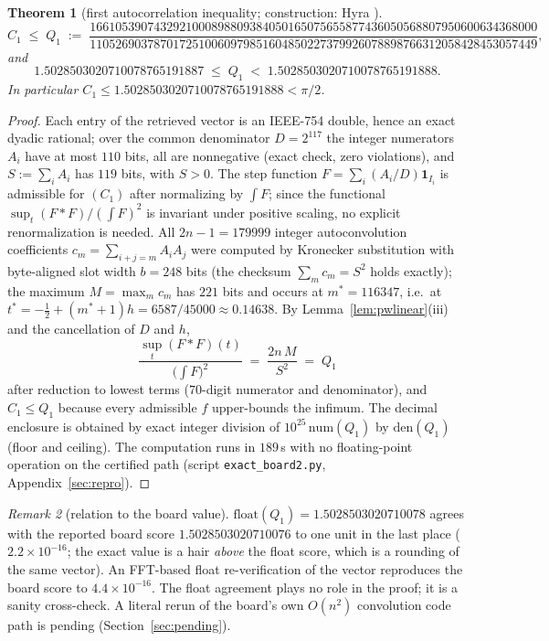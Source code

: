 \documentclass[11pt]{article}
\newtheorem{theorem}{Theorem}
\theoremstyle{remark}
\newtheorem{remark}[theorem]{Remark}
\begin{document}
\begin{theorem}[first autocorrelation inequality; construction: Hyra
\cite{Hyra26}]\label{thm:c1}
\[
C_1 \;\le\; Q_1 \;:=\;
\frac{1661053907432921000898809384050165075655877436050568807950600634368000}
     {1105269037870172510060979851604850227379926078898766312058428453057449},
\]
and
\[
1.5028503020710078765191887 \;\le\; Q_1 \;<\; 1.5028503020710078765191888 .
\]
In particular $C_1 \le 1.5028503020710078765191888 < \pi/2$.
\end{theorem}

\begin{proof}
Each entry of the retrieved vector is an IEEE-754 double, hence an exact
dyadic rational; over the common denominator $D = 2^{117}$ the integer
numerators $A_i$ have at most $110$ bits, all are nonnegative (exact check,
zero violations), and $S := \sum_i A_i$ has $119$ bits, with $S > 0$. The
step function $F = \sum_i (A_i/D) \mathbf{1}_{I_i}$ is admissible for
$(C_1)$ after normalizing by $\int F$; since the functional
$\sup_t (F*F) / (\int F)^2$ is invariant under positive scaling, no explicit
renormalization is needed. All $2n - 1 = 179999$ integer autoconvolution
coefficients $c_m = \sum_{i+j=m} A_i A_j$ were computed by Kronecker
substitution with byte-aligned slot width $b = 248$ bits (the checksum
$\sum_m c_m = S^2$ holds exactly); the maximum $M = \max_m c_m$ has $221$
bits and occurs at $m^\ast = 116347$, i.e.\ at
$t^\ast = -\tfrac12 + (m^\ast + 1)h = 6587/45000 \approx 0.14638$. By
Lemma~\ref{lem:pwlinear}(iii) and the cancellation of $D$ and $h$,
\[
\frac{\sup_t (F * F)(t)}{\bigl(\int F\bigr)^2}
\;=\; \frac{2n\,M}{S^2} \;=\; Q_1
\]
after reduction to lowest terms ($70$-digit numerator and denominator), and
$C_1 \le Q_1$ because every admissible $f$ upper-bounds the infimum. The
decimal enclosure is obtained by exact integer division of
$10^{25}\,\mathrm{num}(Q_1)$ by $\mathrm{den}(Q_1)$ (floor and ceiling). The
computation runs in $189$\,s with no floating-point operation on the
certified path (script \texttt{exact\_board2.py},
Appendix~\ref{sec:repro}).
\end{proof}

\begin{remark}[relation to the board value]\label{rem:c1board}
$\mathrm{float}(Q_1) = 1.5028503020710078$ agrees with the reported board
score $1.5028503020710076$ to one unit in the last place
($2.2\times10^{-16}$; the exact value is a hair \emph{above} the float
score, which is a rounding of the same vector). An FFT-based float
re-verification of the vector reproduces the board score to
$4.4\times10^{-16}$. The float agreement plays no role in the proof; it is
a sanity cross-check. A literal rerun of the board's own $O(n^2)$
convolution code path is pending (Section~\ref{sec:pending}).
\end{remark}
\end{document}

